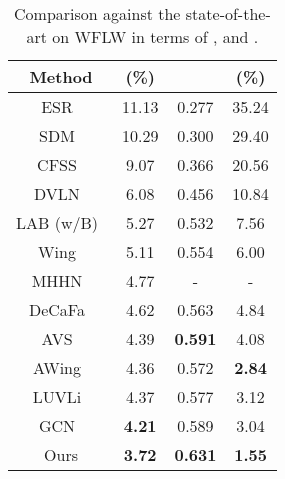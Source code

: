 \documentclass{bmvc2k}
\newcommand{\best}[1]{\color{red}\textbf{#1}}
\newcommand{\secondb}[1]{\color{blue}\textbf{#1}}
\begin{document}
\begin{table}[!htbp]
	\caption{Comparison against the state-of-the-art on WFLW in terms of ,  and .}\label{tab:sota_wflw}
	\centering
		\begin{tabular}{cccc}
			\toprule
			Method & (\%) &  &  (\%) \\
			\midrule
			ESR~\cite{cao2014face} & 11.13 & 0.277 & 35.24 \\
			SDM~\cite{xiong2013supervised} & 10.29 & 0.300 & 29.40 \\
            CFSS~\cite{zhu2015cfss} & 9.07 & 0.366 & 20.56 \\
            DVLN~\cite{wu2017leveraging} & 6.08 & 0.456 & 10.84 \\
            LAB (w/B)~\cite{wu2018look} & 5.27 & 0.532 & 7.56 \\
            Wing~\cite{feng2018wing} & 5.11 & 0.554 & 6.00 \\
            MHHN~\cite{wan2020robust} & 4.77 & - & - \\
            DeCaFa~\cite{dapogny2019decafa} & 4.62 & 0.563 & 4.84  \\
            AVS~\cite{qian2019aggregation} & 4.39 & \secondb{0.591} & 4.08  \\
            AWing~\cite{wang2019adaptive} & 4.36 & 0.572 & \secondb{2.84}  \\
            LUVLi~\cite{kumar2020luvli} & 4.37 & 0.577 & 3.12 \\
            GCN~\cite{li2020structured} & \secondb{4.21} & 0.589 & 3.04 \\
            Ours & \best{3.72} & \best{0.631} & \best{1.55} \\ 
			\bottomrule
		\end{tabular}
\end{table}
\end{document}
